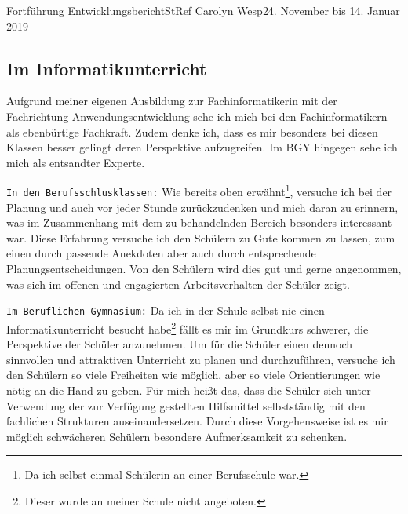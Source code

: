 \documentclass[oneside,openany,headings=optiontotoc,11pt,numbers=noenddot]{article}
\begin{document}
\begin{worksheet}{Fortführung Entwicklungsbericht}{StRef\grq{} Carolyn Wesp}{24. November bis 14. Januar 2019}
		\subsection*{Im Informatikunterricht}
		Aufgrund meiner eigenen Ausbildung zur Fachinformatikerin mit der Fachrichtung Anwendungsentwicklung sehe ich mich bei den Fachinformatikern als ebenbürtige Fachkraft. Zudem denke ich, dass es mir besonders bei diesen Klassen besser gelingt deren Perspektive aufzugreifen. Im BGY hingegen sehe ich mich als entsandter Experte.\\
		\par\noindent
		\texttt{In den Berufsschlusklassen:} Wie bereits oben erwähnt\footnote{Da ich selbst einmal Schülerin an einer Berufsschule war.}, versuche ich bei der Planung und auch vor jeder Stunde zurückzudenken und mich daran zu erinnern, was im Zusammenhang mit dem zu behandelnden Bereich besonders interessant war. Diese Erfahrung versuche ich den Schülern zu Gute kommen zu lassen, zum einen durch passende Anekdoten aber auch durch entsprechende Planungsentscheidungen. Von den Schülern wird dies gut und gerne angenommen, was sich im offenen und engagierten Arbeitsverhalten der Schüler zeigt.\\
		\par\noindent
		\texttt{Im Beruflichen Gymnasium:} Da ich in der Schule selbst nie einen Informatikunterricht besucht habe\footnote{Dieser wurde an meiner Schule nicht angeboten.} fällt es mir im Grundkurs schwerer, die Perspektive der Schüler anzunehmen. Um für die Schüler einen dennoch sinnvollen und attraktiven Unterricht zu planen und durchzuführen, versuche ich den Schülern so viele Freiheiten wie möglich, aber so viele Orientierungen wie nötig an die Hand zu geben. Für mich heißt das, dass die Schüler sich unter Verwendung der zur Verfügung gestellten Hilfsmittel selbstständig mit den fachlichen Strukturen auseinandersetzen. Durch diese Vorgehensweise ist es mir möglich schwächeren Schülern besondere Aufmerksamkeit zu schenken.

\end{worksheet}
\end{document}
